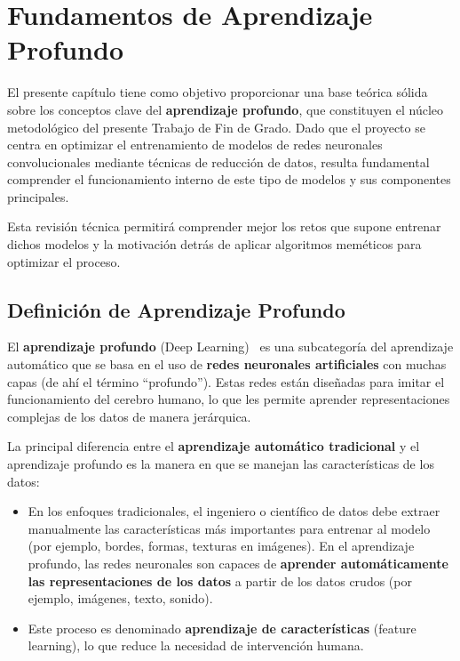 
\chapter{Fundamentos de Aprendizaje Profundo}\label{ch:fundamentos-de-aprendizaje-profundo}

El presente capítulo tiene como objetivo proporcionar una base teórica sólida sobre los conceptos clave del \textbf{aprendizaje profundo}, 
que constituyen el núcleo metodológico del presente Trabajo de Fin de Grado.
Dado que el proyecto se centra en optimizar el entrenamiento de modelos de redes neuronales convolucionales mediante técnicas de reducción de datos,
resulta fundamental comprender el funcionamiento interno de este tipo de modelos y sus componentes principales.

Esta revisión técnica permitirá comprender mejor los retos que supone entrenar dichos modelos y la motivación detrás de aplicar algoritmos meméticos para optimizar el proceso.


\section{Definición de Aprendizaje Profundo}\label{sec:definicion-de-aprendizaje-profundo}
El \textbf{aprendizaje profundo} (Deep Learning)~\cite{weidmanDeepLearningScratch2019} es una subcategoría del aprendizaje
automático que se basa en el uso de \textbf{redes neuronales artificiales} con muchas capas (de ahí el término
``profundo'').
Estas redes están diseñadas para imitar el funcionamiento del cerebro humano, lo que les permite aprender
representaciones complejas de los datos de manera jerárquica.


La principal diferencia entre el \textbf{aprendizaje automático tradicional} y el aprendizaje profundo es la manera en
que se manejan las características de los datos:
\begin{itemize}
    \item En los enfoques tradicionales, el ingeniero o científico de datos debe extraer manualmente las
          características más importantes para entrenar al modelo (por ejemplo, bordes, formas, texturas en imágenes).
          En el aprendizaje profundo, las redes neuronales son capaces de
          \textbf{aprender automáticamente las representaciones de los datos} a partir de los datos crudos (por ejemplo,
          imágenes, texto, sonido).
    \item Este proceso es denominado \textbf{aprendizaje de características} (feature learning), lo que reduce la
          necesidad de intervención humana.
\end{itemize}

